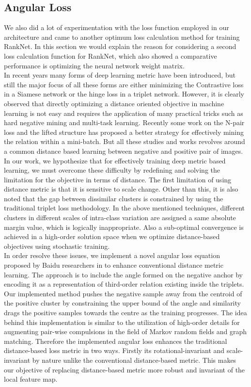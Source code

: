 \documentclass[10pt,twocolumn,letterpaper]{article}
\begin{document}
\subsection{Angular Loss}
We also did a lot of experimentation with the loss function employed in our architecture and came to another optimum loss calculation method for training RankNet. In this section we would explain the reason for considering a second loss calculation function for RankNet, which also showed a comparative performance is optimizing the neural network weight matrix.\\
In recent years many forms of deep learning metric have been introduced, but still the major focus of all these forms are either minimizing the Contrastive loss in a Siamese network or the hinge loss in a triplet network. However, it is clearly observed that directly optimizing a distance oriented objective in machine learning is not easy and requires the application of many practical tricks such as hard negative mining and multi-task learning. Recently some work on the N-pair loss and the lifted structure has proposed a better strategy for effectively mining the relation within a mini-batch. But all these studies and works revolves around a common distance based learning between negative and positive pair of images. In our work, we hypothesize that for effectively training deep metric based learning, we must overcome these difficulty by redefining and solving the limitation for the objective in terms of distance. The first limitation of using distance metric is that it is sensitive to scale change. Other than this, it is also noted that the gap between dissimilar clusters is constrained by using the traditional triplet loss methodology. In the above mentioned techniques, different clusters in different scales of intra-class variation are assigned a same absolute margin value, which is logically inappropriate. Also a sub-optimal convergence is achieved in a high-order solution space when we optimize distance-based objectives using stochastic training.\\
In order resolve these issues, we implement a novel angular loss equation proposed by Baidu researchers in \cite{c49} to enhance conventional distance metric learning. The approach is to include the angle formed on the negative anchor by encoding it as a representation of third-order relation existing inside the triplets. Our implemented method pushes the negative sample away from the centroid of the positive cluster by constraining the upper bound of the angle and similarity drags the positive samples towards the centre as the training progresses. The idea behind this implementation is similar to the utilization of high-order details for augmenting pair-wise compulsions in the field of Markov random fields and graph matching. Therefore the implemented angular loss enhances the traditional distance-based loss metric in two ways. Firstly its rotational-invariant and scale-invariant by nature unlike the conventional distance-based metric. This makes our objective of replacing distance-based metric more robust and invariant of the local feature map.\\
\end{document}
